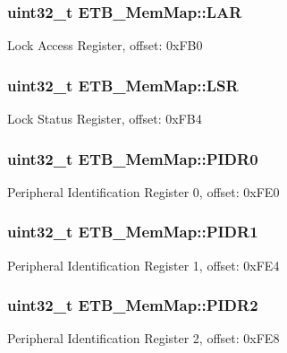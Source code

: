 \subsubsection[{L\+A\+R}]{\setlength{\rightskip}{0pt plus 5cm}uint32\+\_\+t E\+T\+B\+\_\+\+Mem\+Map\+::\+L\+A\+R}\label{struct_e_t_b___mem_map_ae5221e565fed13a5f544c207c5f18843}
Lock Access Register, offset\+: 0x\+F\+B0 \hypertarget{struct_e_t_b___mem_map_a92be1954eec6c20cefd3f7a2ea2fc2b7}{}
\subsubsection[{L\+S\+R}]{\setlength{\rightskip}{0pt plus 5cm}uint32\+\_\+t E\+T\+B\+\_\+\+Mem\+Map\+::\+L\+S\+R}\label{struct_e_t_b___mem_map_a92be1954eec6c20cefd3f7a2ea2fc2b7}
Lock Status Register, offset\+: 0x\+F\+B4 \hypertarget{struct_e_t_b___mem_map_a7cca8cc873dc51b739a8f2a26b01cd22}{}
\subsubsection[{P\+I\+D\+R0}]{\setlength{\rightskip}{0pt plus 5cm}uint32\+\_\+t E\+T\+B\+\_\+\+Mem\+Map\+::\+P\+I\+D\+R0}\label{struct_e_t_b___mem_map_a7cca8cc873dc51b739a8f2a26b01cd22}
Peripheral Identification Register 0, offset\+: 0x\+F\+E0 \hypertarget{struct_e_t_b___mem_map_a608af25e75d3f8e98b484e53c286aaed}{}
\subsubsection[{P\+I\+D\+R1}]{\setlength{\rightskip}{0pt plus 5cm}uint32\+\_\+t E\+T\+B\+\_\+\+Mem\+Map\+::\+P\+I\+D\+R1}\label{struct_e_t_b___mem_map_a608af25e75d3f8e98b484e53c286aaed}
Peripheral Identification Register 1, offset\+: 0x\+F\+E4 \hypertarget{struct_e_t_b___mem_map_a29cf14afb49d11bc1c1ab4df4b9b23f5}{}
\subsubsection[{P\+I\+D\+R2}]{\setlength{\rightskip}{0pt plus 5cm}uint32\+\_\+t E\+T\+B\+\_\+\+Mem\+Map\+::\+P\+I\+D\+R2}\label{struct_e_t_b___mem_map_a29cf14afb49d11bc1c1ab4df4b9b23f5}
Peripheral Identification Register 2, offset\+: 0x\+F\+E8 \hypertarget{struct_e_t_b___mem_map_aca8df6dc059f2ca8eb432f2f74a09149}{}
